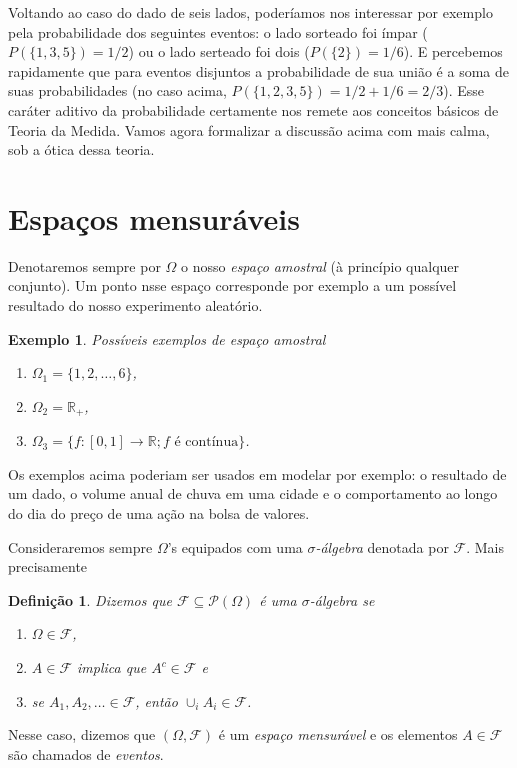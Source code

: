 \documentclass[reqno, draft]{book}
\newcommand*\1{\mathds{1}}
\newtheorem{definition}[theorem]{Definição}
\newtheorem{example}{Exemplo}[section]
\begin{document}
Voltando ao caso do dado de seis lados, poderíamos nos interessar por exemplo pela probabilidade dos seguintes eventos: o lado sorteado foi ímpar ($P(\{1,3,5\}) = 1/2$) ou o lado serteado foi dois ($P(\{2\}) = 1/6$).
E percebemos rapidamente que para eventos disjuntos a probabilidade de sua união é a soma de suas probabilidades (no caso acima, $P(\{1,2,3,5\}) = 1/2 + 1/6 = 2/3$).
Esse caráter aditivo da probabilidade certamente nos remete aos conceitos básicos de Teoria da Medida.
Vamos agora formalizar a discussão acima com mais calma, sob a ótica dessa teoria.

\section{Espaços mensuráveis}

Denotaremos sempre por $\Omega$ o nosso \emph{espaço amostral}  (à princípio qualquer conjunto).
Um ponto nsse espaço corresponde por exemplo a um possível resultado do nosso experimento aleatório.

\begin{example} Possíveis exemplos de espaço amostral
  \label{x:espacos_amostrais}
  \begin{enumerate}[\quad a)]
  \item $\Omega_1 = \{1, 2, \dots, 6\}$,
  \item $\Omega_2 = \mathbb{R}_+$,
  \item $\Omega_3 = \{f:[0,1] \to \mathbb{R}; \text{$f$ é contínua}\}$.
  \end{enumerate}
\end{example}
Os exemplos acima poderiam ser usados em modelar por exemplo: o resultado de um dado, o volume anual de chuva em uma cidade e o comportamento ao longo do dia do preço de uma ação na bolsa de valores.

Consideraremos sempre $\Omega$'s equipados com uma \emph{$\sigma$-álgebra}  denotada por $\mathcal{F}$.
Mais precisamente
\begin{definition}
  Dizemos que $\mathcal{F} \subseteq \mathcal{P}(\Omega)$ é uma $\sigma$-álgebra se
  \begin{enumerate}[\quad a)]
  \item $\Omega \in \mathcal{F}$,
  \item $A \in \mathcal{F}$ implica que $A^c \in \mathcal{F}$ e
  \item se $A_1, A_2, \dots \in \mathcal{F}$, então $\cup_i A_i \in \mathcal{F}$.
  \end{enumerate}
\end{definition}
Nesse caso, dizemos que $(\Omega, \mathcal{F})$ é um \emph{espaço mensurável}  e os elementos $A \in \mathcal{F}$ são chamados de \emph{eventos}. 
\end{document}
